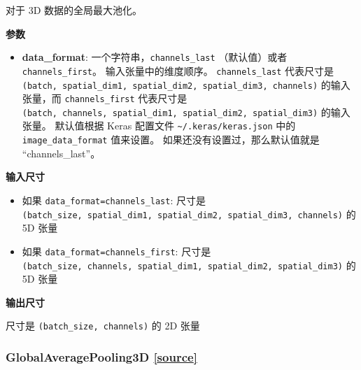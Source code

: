 \begin{Shaded}
\begin{Highlighting}[]
\OperatorTok{=}\NormalTok{)}
\end{Highlighting}
\end{Shaded}

对于 3D 数据的全局最大池化。

\textbf{参数}

\begin{itemize}
\tightlist
\item
  \textbf{data\_format}: 一个字符串，\texttt{channels\_last}
  （默认值）或者 \texttt{channels\_first}。 输入张量中的维度顺序。
  \texttt{channels\_last} 代表尺寸是
  \texttt{(batch,\ spatial\_dim1,\ spatial\_dim2,\ spatial\_dim3,\ channels)}
  的输入张量，而 \texttt{channels\_first} 代表尺寸是
  \texttt{(batch,\ channels,\ spatial\_dim1,\ spatial\_dim2,\ spatial\_dim3)}
  的输入张量。 默认值根据 Keras 配置文件
  \texttt{\textasciitilde{}/.keras/keras.json} 中的
  \texttt{image\_data\_format} 值来设置。
  如果还没有设置过，那么默认值就是 ``channels\_last''。
\end{itemize}

\textbf{输入尺寸}

\begin{itemize}
\tightlist
\item
  如果
  \texttt{data\_format=\textquotesingle{}channels\_last\textquotesingle{}}:
  尺寸是
  \texttt{(batch\_size,\ spatial\_dim1,\ spatial\_dim2,\ spatial\_dim3,\ channels)}
  的 5D 张量
\item
  如果
  \texttt{data\_format=\textquotesingle{}channels\_first\textquotesingle{}}:
  尺寸是
  \texttt{(batch\_size,\ channels,\ spatial\_dim1,\ spatial\_dim2,\ spatial\_dim3)}
  的 5D 张量
\end{itemize}

\textbf{输出尺寸}

尺寸是 \texttt{(batch\_size,\ channels)} 的 2D 张量


\subsubsection{GlobalAveragePooling3D {\href{https://github.com/keras-team/keras/blob/master/keras/layers/pooling.py\#L604}{{[}source{]}}}}

\begin{Shaded}
\begin{Highlighting}[]
\OperatorTok{=}\NormalTok{)}
\end{Highlighting}
\end{Shaded}

